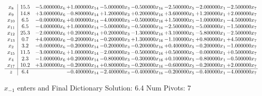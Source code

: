 \documentclass[10pt]{article}
\begin{document}
 \[\begin{array}{c| c c@{\hskip 2pt} c@{\hskip 2pt} c@{\hskip 2pt} c@{\hskip 2pt} c@{\hskip 2pt} c@{\hskip 2pt} c@{\hskip 2pt} }
 x_{8}   &  15.5 & -5.000000 x_{6} & + 1.000000 x_{14} & -5.000000 x_{3} & -0.500000 x_{16} & -2.500000 x_{5} & -2.000000 x_{1} & -2.500000 x_{7}\\
 x_{9}   &  14.8 & + 3.000000 x_{6} & -0.800000 x_{14} & + 1.200000 x_{3} & + 0.200000 x_{16} & + 3.600000 x_{5} & + 1.200000 x_{1} & + 2.000000 x_{7}\\
 x_{10}   &  6.5 & -0.000000 x_{6} & + 0.000000 x_{14} & -4.000000 x_{3} & -0.500000 x_{16} & + 1.500000 x_{5} & -1.000000 x_{1} & -4.500000 x_{7}\\
 x_{11}   &  6.5 & -4.000000 x_{6} & + 1.000000 x_{14} & -5.000000 x_{3} & -0.500000 x_{16} & -2.500000 x_{5} & -5.000000 x_{1} & -1.500000 x_{7}\\
 x_{12}   &  25.3 & -2.000000 x_{6} & + 0.200000 x_{14} & + 0.200000 x_{3} & -1.300000 x_{16} & + 3.100000 x_{5} & -5.800000 x_{1} & -2.500000 x_{7}\\
 x_{13}   &  0.7 & + 4.000000 x_{6} & -0.200000 x_{14} & -0.200000 x_{3} & + 1.300000 x_{16} & -1.100000 x_{5} & + 0.800000 x_{1} & + 4.500000 x_{7}\\
 x_{2}   &  3.2 & -0.000000 x_{6} & -0.200000 x_{14} & -0.200000 x_{3} & -0.200000 x_{16} & + 0.400000 x_{5} & -0.200000 x_{1} & -1.000000 x_{7}\\
 x_{15}   &  11.5 & -3.000000 x_{6} & + 1.000000 x_{14} & -2.000000 x_{3} & -0.500000 x_{16} & + 0.500000 x_{5} & -0.000000 x_{1} & + 0.500000 x_{7}\\
 x_{4}   &  2.3 & -1.000000 x_{6} & + 0.200000 x_{14} & -0.800000 x_{3} & -0.300000 x_{16} & + 0.100000 x_{5} & -0.800000 x_{1} & -0.500000 x_{7}\\
 x_{17}   &  10.2 & + 3.000000 x_{6} & -0.200000 x_{14} & + 0.800000 x_{3} & -0.200000 x_{16} & -0.600000 x_{5} & -0.200000 x_{1} & + 2.000000 x_{7}\\
\hline
z    &  6.4  &   & -0.400000 x_{14} & -2.400000 x_{3} & -0.400000 x_{16} & -0.200000 x_{5} & -0.400000 x_{1} & -4.000000 x_{7}\\
\end{array}\]


 $ x_{-1} $ enters and Final Dictionary
Solution:  6.4
Num Pivots:  7
\end{document}
